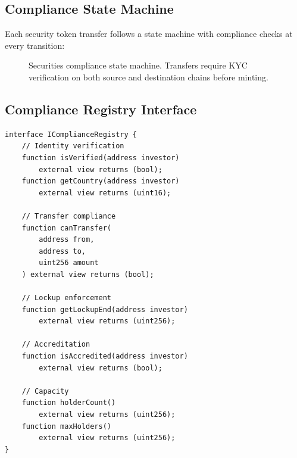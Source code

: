 \subsection{Compliance State Machine}

Each security token transfer follows a state machine with compliance checks at every transition:

\begin{figure}[h]
\centering
{}
\caption{Securities compliance state machine. Transfers require KYC verification on both source and destination chains before minting.}
\label{fig:compliance-sm}
\end{figure}

\subsection{Compliance Registry Interface}

\begin{lstlisting}[language=Solidity,caption=IComplianceRegistry interface]
interface IComplianceRegistry {
    // Identity verification
    function isVerified(address investor)
        external view returns (bool);
    function getCountry(address investor)
        external view returns (uint16);

    // Transfer compliance
    function canTransfer(
        address from,
        address to,
        uint256 amount
    ) external view returns (bool);

    // Lockup enforcement
    function getLockupEnd(address investor)
        external view returns (uint256);

    // Accreditation
    function isAccredited(address investor)
        external view returns (bool);

    // Capacity
    function holderCount()
        external view returns (uint256);
    function maxHolders()
        external view returns (uint256);
}
\end{lstlisting}

